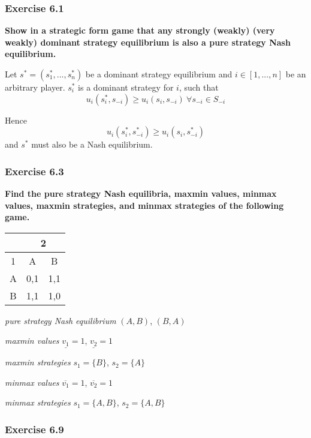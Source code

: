 \documentclass[12pt, a4paper]{article}
\begin{document}
\subsubsection*{Exercise 6.1}
\textbf{Show in a strategic form game that any strongly (weakly) (very weakly) dominant strategy equilibrium is also a pure strategy Nash equilibrium.}

Let $s^* = (s_1^*, ..., s_n^*)$ be a dominant strategy equilibrium and $i\in [1,...,n]$ be an arbitrary player. $s_i^*$ is a dominant strategy for $i$, such that
\[ u_i(s_i^*, s_{-i}) \geq u_i(s_i,s_{-i})\ \forall s_{-i}\in S_{-i} \]

Hence
\[ u_i(s_i^*, s_{-i}^*) \geq u_i(s_i, s_{-i}^*) \]
and $s^*$ must also be a Nash equilibrium.

\subsubsection*{Exercise 6.3}

\textbf{Find the pure strategy Nash equilibria, maxmin values, minmax values, maxmin strategies, and minmax strategies of the following game.}

\begin{table}[ht!]
	\centering
	\begin{tabular}{|c|c|c|} \hline
		& \multicolumn{2}{|c|}{2} \\ \hline
		1 & A & B \\ \hline
		A & 0,1 & 1,1 \\ \hline
		B & 1,1 & 1,0 \\ \hline
	\end{tabular}
\end{table}

\textit{pure strategy Nash equilibrium} $(A,B)$, $(B,A)$

\textit{maxmin values} $\underline{v_1}=1$, $\underline{v_2}=1$

\textit{maxmin strategies} $s_1=\{B\}$, $s_2=\{A\}$

\textit{minmax values} $\overline{v_1}=1$, $\overline{v_2}=1$

\textit{minmax strategies} $s_1=\{A, B\}$, $s_2=\{A,B\}$


\subsubsection*{Exercise 6.9}
\end{document}
